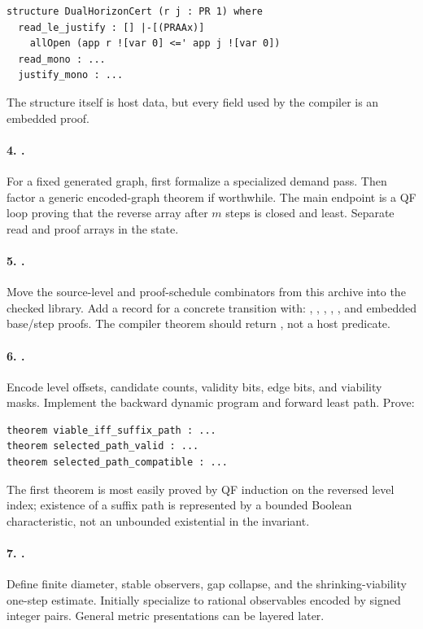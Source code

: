 \begin{lstlisting}
structure DualHorizonCert (r j : PR 1) where
  read_le_justify : [] |-[(PRAAx)]
    allOpen (app r ![var 0] <=' app j ![var 0])
  read_mono : ...
  justify_mono : ...
\end{lstlisting}

The structure itself is host data, but every field used by the compiler is an embedded
proof.

\paragraph{4. .}
For a fixed generated graph, first formalize a specialized demand pass.  Then factor a
generic encoded-graph theorem if worthwhile.  The main endpoint is a QF loop proving
that the reverse array after \(m\) steps is closed and least.  Separate read and proof
arrays in the state.

\paragraph{5. .}
Move the source-level  and proof-schedule combinators from this archive
into the checked library.  Add a record for a concrete transition with:
, , , , , and embedded base/step
proofs.  The compiler theorem should return , not a host predicate.

\paragraph{6. .}
Encode level offsets, candidate counts, validity bits, edge bits, and viability masks.
Implement the backward dynamic program and forward least path.  Prove:

\begin{lstlisting}
theorem viable_iff_suffix_path : ...
theorem selected_path_valid : ...
theorem selected_path_compatible : ...
\end{lstlisting}

The first theorem is most easily proved by QF induction on the reversed level index;
existence of a suffix path is represented by a bounded Boolean characteristic, not an
unbounded existential in the invariant.

\paragraph{7. .}
Define finite diameter, stable observers, gap collapse, and the shrinking-viability
one-step estimate.  Initially specialize to rational observables encoded by signed
integer pairs.  General metric presentations can be layered later.

